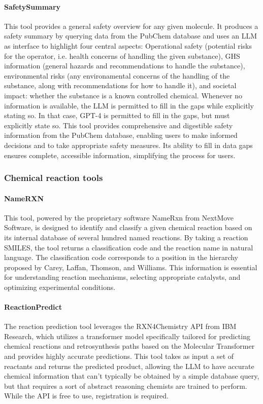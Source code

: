 \documentclass[10pt]{article}
\begin{document}
\paragraph{SafetySummary} 
This tool provides a general safety overview for any given molecule. It produces a safety summary by querying data from the PubChem database \cite{pubchem} and uses an LLM as interface to highlight four central aspects: Operational safety (potential risks for the operator, i.e. health concerns of handling the given substance), GHS information (general hazards and recommendations to handle the substance), environmental risks (any environamental concerns of the handling of the substance, along with recommendations for how to handle it), and societal impact: whether the substance is a known controlled chemical. Whenever no information is available, the LLM is permitted to fill in the gaps while explicitly stating so. In that case, GPT-4 is permitted to fill in the gaps, but must explicitly state so. This tool provides comprehensive and digestible safety information from the PubChem database, enabling users to make informed decisions and to take appropriate safety measures. Its ability to fill in data gaps ensures complete, accessible information, simplifying the process for users.

\subsubsection{Chemical reaction tools}

\paragraph{NameRXN}
This tool, powered by the proprietary software NameRxn from NextMove Software\cite{namerxn}, is designed to identify and classify a given chemical reaction based on its internal database of several hundred named reactions. By taking a reaction SMILES, the tool returns a classification code and the reaction name in natural language. The classification code corresponds to a position in the hierarchy proposed by Carey, Laffan, Thomson, and Williams\cite{carey2006analysis}. This information is essential for understanding reaction mechanisms, selecting appropriate catalysts, and optimizing experimental conditions. 


\paragraph{ReactionPredict}
The reaction prediction tool leverages the RXN4Chemistry API from IBM Research\cite{rxn4chemistry}, which utilizes a transformer model specifically tailored for predicting chemical reactions and retrosynthesis paths based on the Molecular Transformer\cite{schwaller2019molecular, schwaller2020predicting} and provides highly accurate predictions. This tool takes as input a set of reactants and returns the predicted product, allowing the LLM to have accurate chemical information that can't typically be obtained by a simple database query, but that requires a sort of abstract reasoning chemists are trained to perform. While the API is free to use, registration is required.
\end{document}

